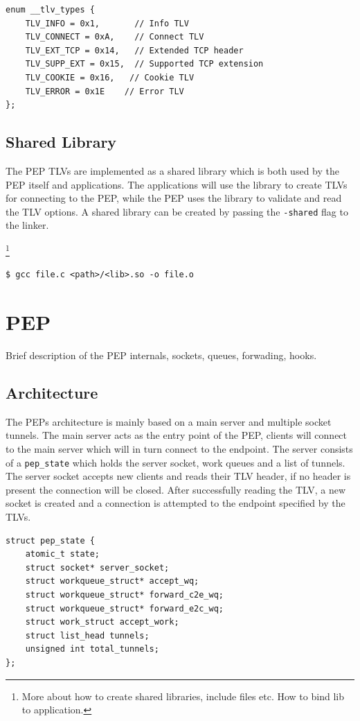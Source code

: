 \documentclass[a4paper,english, 11pt]{report}
\begin{document}
\begin{verbatim}
enum __tlv_types {
    TLV_INFO = 0x1,    	  // Info TLV
    TLV_CONNECT = 0xA,    // Connect TLV          
    TLV_EXT_TCP = 0x14,   // Extended TCP header
    TLV_SUPP_EXT = 0x15,  // Supported TCP extension
    TLV_COOKIE = 0x16,   // Cookie TLV
    TLV_ERROR = 0x1E    // Error TLV
};
\end{verbatim}

\subsection{Shared Library}
The PEP TLVs are implemented as a shared library which is both used by the PEP itself and applications. The applications will use the library to create TLVs for connecting to the PEP, while the PEP uses the library to validate and read the TLV options. 
A shared library can be created by passing the \verb|-shared| flag to the linker.

\footnote{More about how to create shared libraries, include files etc. How to bind lib to application.}

\begin{verbatim}
$ gcc file.c <path>/<lib>.so -o file.o
\end{verbatim}

\section{PEP}
Brief description of the PEP internals, sockets, queues, forwading, hooks.


\subsection{Architecture}
The PEPs architecture is mainly based on a main server and multiple socket tunnels. The main server acts as the entry point of the PEP, clients will connect to the main server which will in turn connect to the endpoint. The server consists of a \verb|pep_state| which holds the server socket, work queues and a list of tunnels. The server socket accepts new clients and reads their TLV header, if no header is present the connection will be closed. After successfully reading the TLV, a new socket is created and a connection is attempted to the endpoint specified by the TLVs.\\

\noindent\begin{minipage}{\linewidth}
\begin{verbatim}
struct pep_state {
    atomic_t state;
    struct socket* server_socket;
    struct workqueue_struct* accept_wq;
    struct workqueue_struct* forward_c2e_wq;
    struct workqueue_struct* forward_e2c_wq;
    struct work_struct accept_work;
    struct list_head tunnels;
    unsigned int total_tunnels;
};
\end{verbatim}
\label{fig:pep_state_structure}
\end{minipage}
\end{document}
